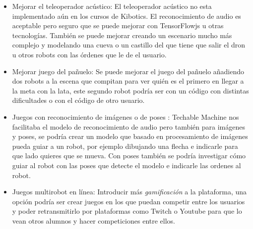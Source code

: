 \begin{itemize}
\item Mejorar el teleoperador acústico: El teleoperador acústico no esta implementado aún en los cursos de  Kibotics. El reconocimiento de audio es aceptable pero seguro que se puede mejorar con TensorFlowjs u otras tecnologías. También se puede mejorar creando un escenario mucho más complejo y modelando una cueva o un castillo del que tiene que salir el dron u otros robots con las órdenes que le de el usuario.

\item Mejorar juego del pañuelo: Se puede mejorar el juego del pañuelo añadiendo dos robots a la escena que compitan para ver quién es el primero en llegar a la meta con la lata, este segundo robot podría ser con un código con distintas dificultades o con el código de otro usuario.

\item  Juegos con reconocimiento de imágenes o de poses : Techable Machine nos facilitaba el modelo de reconocimiento de audio pero también para imágenes y poses, se podría crear un modelo que basado en procesamiento de imágenes pueda guiar a un robot, por ejemplo dibujando una flecha e indicarle para que lado quieres que se mueva. Con poses también se podría investigar cómo guiar al robot con las poses que detecte el modelo e indicarle las ordenes al robot.

\item Juegos multirobot en línea: Introducir más \textit{gamificación} a la plataforma, una opción podría ser crear juegos en los que puedan competir entre los usuarios y poder retransmitirlo por plataformas como Twitch o Youtube para que lo vean otros alumnos y hacer competiciones entre ellos.


\end{itemize}
